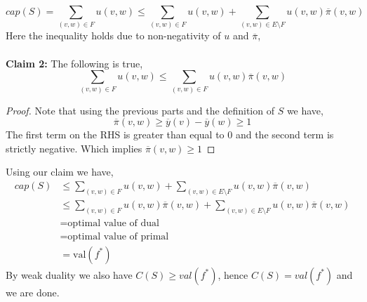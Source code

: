 \documentclass{article}
\numberwithin{equation}{section}
\begin{document}
\begin{equation}
    cap(S) = \sum_{(v, w)\in F} u(v, w) \le \sum_{(v, w)\in F} u(v, w) + \sum_{(v, w)\in E\setminus F} u(v, w)\overline{\pi}(v, w)
\end{equation}
Here the inequality holds due to non-negativity of $u$ and $\overline{\pi}$, \\\\
\textbf{Claim 2:} The following is true, 
\begin{equation*}
    \sum_{(v, w)\in F} u(v, w) \le \sum_{(v, w)\in F} u(v, w)\overline{\pi}(v, w)
\end{equation*}
\begin{proof}
    Note that using the previous parts and the definition of $S$ we have, 
    \begin{equation}
        \overline{\pi}(v, w) \ge \overline{y}(v) - \overline{y}(w) \ge 1
    \end{equation}
    The first term on the RHS is greater than equal to 0 and the second term is strictly negative. Which implies $\overline{\pi}(v, w) \ge 1$
\end{proof}
\noindent Using our claim we have, 
\begin{equation}
    \begin{split}
         cap(S) &\le \sum_{(v, w)\in F} u(v, w) + \sum_{(v, w)\in E\setminus F} u(v, w)\overline{\pi}(v, w)\\
         &\le \sum_{(v, w)\in F} u(v, w)\overline{\pi}(v, w) + \sum_{(v, w)\in E\setminus F} u(v, w)\overline{\pi}(v, w)\\
         &= \text{optimal value of dual}\\
         &= \text{optimal value of primal}\\
         &= \text{val}(f^*)
    \end{split}
\end{equation}
By weak duality we also have $C(S) \ge val(f^*)$, hence $C(S) = val(f^*)$ and we are done. 
\end{document}
